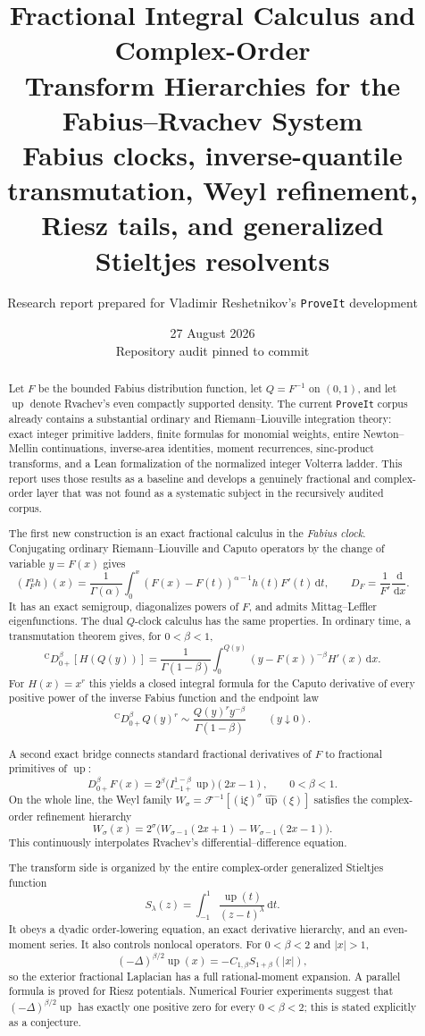 \documentclass[11pt,oneside]{article}
\title{\bfseries\color{DeepBlue}
Fractional Integral Calculus and Complex-Order\\
Transform Hierarchies for the Fabius--Rvachev System\\[0.45em]
\large Fabius clocks, inverse-quantile transmutation, Weyl refinement,\\
Riesz tails, and generalized Stieltjes resolvents}
\author{Research report prepared for Vladimir Reshetnikov's \texttt{ProveIt} development}
\date{27 August 2026\\[0.25em]
\small Repository audit pinned to commit \RepoCommit}
\numberwithin{equation}{section}
\theoremstyle{plain}
\theoremstyle{definition}
\theoremstyle{remark}
\newcommand{\Up}{\operatorname{up}}
\newcommand{\dd}{\,\mathrm d}
\newcommand{\ii}{\mathrm i}
\newcommand{\Four}{\mathcal F}
\newcommand{\Ccap}{\mathrm C}
\begin{document}
\maketitle

\begin{abstract}
Let $F$ be the bounded Fabius distribution function, let $Q=F^{-1}$ on
$(0,1)$, and let $\Up$ denote Rvachev's even compactly supported density.
The current \texttt{ProveIt} corpus already contains a substantial ordinary
and Riemann--Liouville integration theory: exact integer primitive ladders,
finite formulas for monomial weights, entire Newton--Mellin continuations,
inverse-area identities, moment recurrences, sinc-product transforms, and a
Lean formalization of the normalized integer Volterra ladder.  This report
uses those results as a baseline and develops a genuinely fractional and
complex-order layer that was not found as a systematic subject in the
recursively audited corpus.

The first new construction is an exact fractional calculus in the
\emph{Fabius clock}.  Conjugating ordinary Riemann--Liouville and Caputo
operators by the change of variable $y=F(x)$ gives
\[
 (I_F^\alpha h)(x)=\frac1{\Gamma(\alpha)}
 \int_0^x(F(x)-F(t))^{\alpha-1}h(t)F'(t)\dd t,
 \qquad D_F=\frac1{F'}\frac{\dd}{\dd x}.
\]
It has an exact semigroup, diagonalizes powers of $F$, and admits
Mittag--Leffler eigenfunctions.  The dual $Q$-clock calculus has the same
properties.  In ordinary time, a transmutation theorem gives, for
$0<\beta<1$,
\[
 {}^{\Ccap}D_{0+}^{\beta}[H(Q(y))]
 =\frac1{\Gamma(1-\beta)}
 \int_0^{Q(y)}(y-F(x))^{-\beta}H'(x)\dd x.
\]
For $H(x)=x^r$ this yields a closed integral formula for the Caputo derivative
of every positive power of the inverse Fabius function and the endpoint law
\[
 {}^{\Ccap}D_{0+}^{\beta}Q(y)^r
 \sim \frac{Q(y)^r y^{-\beta}}{\Gamma(1-\beta)}
 \qquad(y\downarrow0).
\]

A second exact bridge connects standard fractional derivatives of $F$ to
fractional primitives of $\Up$:
\[
 D_{0+}^{\beta}F(x)
 =2^\beta\bigl(I_{-1+}^{1-\beta}\Up\bigr)(2x-1),
 \qquad 0<\beta<1.
\]
On the whole line, the Weyl family
$W_\sigma=\Four^{-1}[(\ii\xi)^\sigma\widehat{\Up}(\xi)]$
satisfies the complex-order refinement hierarchy
\[
 W_\sigma(x)=2^\sigma
 \bigl(W_{\sigma-1}(2x+1)-W_{\sigma-1}(2x-1)\bigr).
\]
This continuously interpolates Rvachev's differential--difference equation.

The transform side is organized by the entire complex-order generalized
Stieltjes function
\[
 S_\lambda(z)=\int_{-1}^1\frac{\Up(t)}{(z-t)^\lambda}\dd t.
\]
It obeys a dyadic order-lowering equation, an exact derivative hierarchy, and
an even-moment series.  It also controls nonlocal operators.  For
$0<\beta<2$ and $|x|>1$,
\[
 (-\Delta)^{\beta/2}\Up(x)
 =-C_{1,\beta}S_{1+\beta}(|x|),
\]
so the exterior fractional Laplacian has a full rational-moment expansion.
A parallel formula is proved for Riesz potentials.  Numerical Fourier
experiments suggest that $(-\Delta)^{\beta/2}\Up$ has exactly one positive
zero for every $0<\beta<2$; this is stated explicitly as a conjecture.


\end{abstract}
\end{document}
